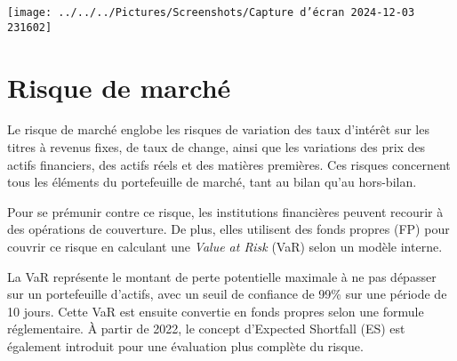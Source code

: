 \documentclass[a4paper, 12pt]{report}
\begin{document}
\begin{center}
	\texttt{[image: ../../../Pictures/Screenshots/Capture d'écran 2024-12-03 231602]}
\end{center}

\section{Risque de marché}

Le risque de marché englobe les risques de variation des taux d’intérêt sur les titres à revenus fixes, de taux de change, ainsi que les variations des prix des actifs financiers, des actifs réels et des matières premières. Ces risques concernent tous les éléments du portefeuille de marché, tant au bilan qu’au hors-bilan.

Pour se prémunir contre ce risque, les institutions financières peuvent recourir à des opérations de couverture. De plus, elles utilisent des fonds propres (FP) pour couvrir ce risque en calculant une \textit{Value at Risk} (VaR) selon un modèle interne.

La VaR représente le montant de perte potentielle maximale à ne pas dépasser sur un portefeuille d’actifs, avec un seuil de confiance de 99\% sur une période de 10 jours. Cette VaR est ensuite convertie en fonds propres selon une formule réglementaire. À partir de 2022, le concept d'Expected Shortfall (ES) est également introduit pour une évaluation plus complète du risque.
\end{document}
